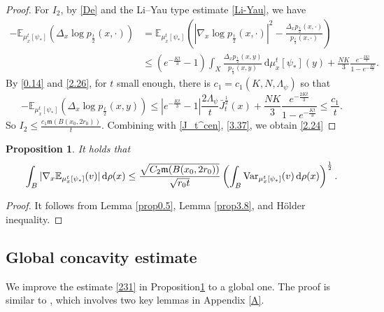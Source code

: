 \documentclass[a4paper,11pt]{article}
\numberwithin{equation}{section}
\theoremstyle{plain}
\newtheorem{proposition}[theorem]{Proposition}
\theoremstyle{definition}
\theoremstyle{remark}
\newcommand{\mm}{\mathfrak m}
\newcommand{\E}{\mathbb{E}}
\renewcommand{\d}{{\mathrm d}}
\begin{document}
\begin{proof}
		For $I_2$, by \eqref{De} and the Li--Yau type estimate \eqref{Li-Yau}, we have
		\begin{equation}
			\begin{aligned}
				-\mathbb{E}_{\mu_x^t[\psi_*]}(\Delta_x \log p_{\frac{t}{2}}(x, \cdot))&=\mathbb{E}_{\mu_x^t[\psi_*]}\left(|\nabla_x \log p_{\frac{t}{2}}(x,\cdot)|^2-\frac{\Delta_x p_{\frac{t}{2}}(x,\cdot)}{p_{\frac{t}{2}}(x,\cdot)}\right)\\
				&\leq (e^{-\frac{Kt}{3}}-1)\int_X \frac{\Delta_x p_\frac{t}{2}(x,y)}{p_\frac{t}{2}(x,y)}\,\d \mu_x^t[\psi_*](y)+\frac{NK}{3}\frac{e^{-\frac{2Kt}{3}}}{1-e^{-\frac{Kt}{3}}}.
			\end{aligned}
		\end{equation}
		By \eqref{0.14} and \eqref{2.26}, for $t$ small enough, there is   $c_1=c_1(K, N, \Lambda_\psi)$ so that
		\begin{equation*}
			-\mathbb{E}_{\mu_x^t[\psi_*]}(\Delta_x \log p_{\frac{t}{2}}(x, y))\leq \left|e^{-\frac{Kt}{3}}-1\right|\frac{2\Lambda_\psi}{t}\bar{J}_t^\frac{1}{2}(x)+\frac{NK}{3}\frac{e^{-\frac{2Kt}{3}}}{1-e^{-\frac{Kt}{3}}}\leq \frac{c_1}{t}.
		\end{equation*}
So
				$I_2
			\leq  \frac{c_1\mm(B(x_0,2r_0))}{t}$.
Combining with \eqref{J_t^cen}, \eqref{3.37}, we obtain \eqref{2.24}
		\end{proof}
		
		\medskip
		
		\begin{proposition}\label{3.9}
		It holds that 
		\begin{equation}\label{231}
		\int_B 	|\nabla_x \E_{\mu_x^t[\psi_*]}(v)|\,\d\rho(x)\leq \frac{\sqrt{C_2\mm(B(x_0,2r_0))}}{\sqrt{r_0
		t}}\left(\int_B {\rm{Var}}_{ \mu_x^t[\psi_*]}(v)\,\d\rho(x)\right)^\frac{1}{2}.
		\end{equation}

		\end{proposition}
		\begin{proof}
	It follows from Lemma \ref{prop0.5}, Lemma \ref{prop3.8}, and H\"{o}lder inequality.
		\end{proof}
		
		
	
	
	\subsection{Global concavity estimate}
	We  improve  the estimate \eqref{231} in Proposition\ref{3.9} to a global one. The proof is similar to  \cite[Lemma 3.3]{arXiv:2411.04908},  which involves two key lemmas in Appendix \ref{A}.
\end{document}
